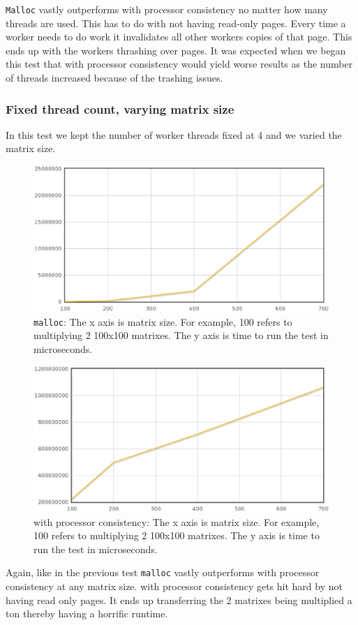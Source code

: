 \verb,Malloc, vastly outperforms \projname{} with processor consistency no matter how many threads are used.  This has to do with not having read-only pages.  Every time a worker needs to do work it invalidates all other workers copies of that page.  This ends up with the workers thrashing over pages.  It was expected when we began this test that \projname{} with processor consistency would yield worse results as the number of threads increased because of the trashing issues.


\subsubsection{Fixed thread count, varying matrix size}

In this test we kept the number of worker threads fixed at 4 and we varied the matrix size.

\begin{figure}[!h]
\centering
\includegraphics[scale=0.40]{images/malloc-fixed-thread.eps}
\caption{\verb,malloc,: The x axis is matrix size. For example, 100 refers to multiplying 2 100x100 matrixes. The y axis is time to run the test in microseconds.}
\end{figure}

\begin{figure}[!h]
\centering
\includegraphics[scale=0.40]{images/mmult-lh-fixed-thread.eps}
\caption{\projname{} with processor consistency: The x axis is matrix size. For example, 100 refers to multiplying 2 100x100 matrixes. The y axis is time to run the test in microseconds.}
\end{figure}

Again, like in the previous test \verb,malloc, vastly outperforms \projname{} with processor consistency at any matrix size. \projname{} with processor consistency gets hit hard by not having read only pages. It ends up transferring the 2 matrixes being multiplied a ton thereby having a horrific runtime.
